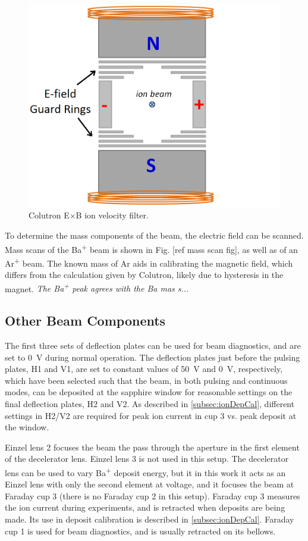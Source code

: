 \begin{figure}[h]
        \centering
                \includegraphics[width=.7\textwidth]{figures/ExB.png}
                \caption{Colutron E$\times$B ion velocity filter.}
\label{fig:exb}
\end{figure}

To determine the mass components of the beam, the electric field can be scanned.  Mass scans of the Ba\textsuperscript{+} beam is shown in Fig. [ref mass scan fig], as well as of an Ar\textsuperscript{+} beam.  The known mass of Ar aids in calibrating the magnetic field, which differs from the calculation given by Colutron, likely due to hysteresis in the magnet.  \emph{\color{gray}The Ba\textsuperscript{+} peak agrees with the Ba mas s... }

\subsection{Other Beam Components}

The first three sets of deflection plates can be used for beam diagnostics, and are set to 0~V during normal operation.  The deflection plates just before the pulsing plates, H1 and V1, are set to constant values of 50~V and 0~V, respectively, which have been selected such that the beam, in both pulsing and continuous modes, can be deposited at the sapphire window for reasonable settings on the final deflection plates, H2 and V2.  As described in \ref{subsec:ionDepCal}, different settings in H2/V2 are required for peak ion current in cup 3 vs. peak deposit at the window.

Einzel lens 2 focuses the beam the pass through the aperture in the first element of the decelerator lens.  Einzel lens 3 is not used in this setup.  The decelerator lens can be used to vary Ba\textsuperscript{+} deposit energy, but it in this work it acts as an Einzel lens with only the second element at voltage, and it focuses the beam at Faraday cup 3 (there is no Faraday cup 2 in this setup).  Faraday cup 3 measures the ion current during experiments, and is retracted when deposits are being made.  Its use in deposit calibration is described in \ref{subsec:ionDepCal}.  Faraday cup 1 is used for beam diagnostics, and is usually retracted on its bellows.  

